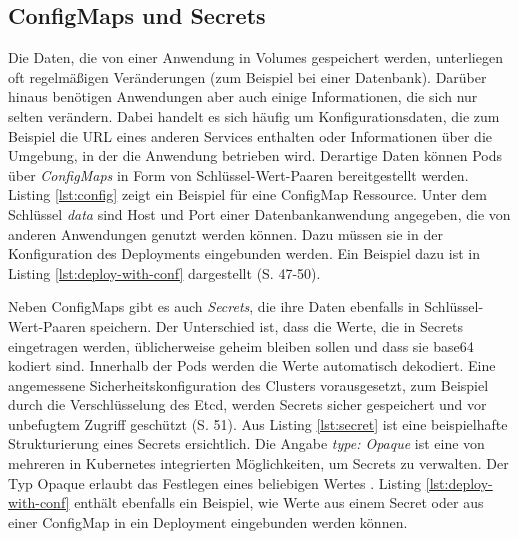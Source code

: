 \documentclass[11pt,a4paper]{article}
\begin{document}
\subsection{ConfigMaps und Secrets}
Die Daten, die von einer Anwendung in Volumes gespeichert werden, unterliegen oft regelmäßigen Veränderungen
(zum Beispiel bei einer Datenbank). Darüber hinaus benötigen Anwendungen aber auch einige Informationen, die sich nur
selten verändern. Dabei handelt es sich häufig um Konfigurationsdaten, die zum Beispiel die URL eines anderen
Services enthalten oder Informationen über die Umgebung, in der die Anwendung betrieben wird.
Derartige Daten können Pods über \emph{ConfigMaps} in Form von Schlüssel-Wert-Paaren bereitgestellt werden.
Listing \ref{lst:config} zeigt ein Beispiel für eine ConfigMap Ressource.
Unter dem Schlüssel \emph{data} sind Host und Port einer Datenbankanwendung angegeben,
die von anderen Anwendungen genutzt werden können. Dazu müssen sie in der Konfiguration des
Deployments eingebunden werden. Ein Beispiel dazu ist in Listing \ref{lst:deploy-with-conf} dargestellt \cite{Schmeling_Dargatz_2022} (S. 47-50).

% 


Neben ConfigMaps gibt es auch \emph{Secrets}, die ihre Daten ebenfalls in Schlüssel-Wert-Paaren speichern.
Der Unterschied ist, dass die Werte, die in Secrets eingetragen werden, üblicherweise geheim bleiben sollen und
dass sie base64 \cite{rfc4648} kodiert sind. Innerhalb der Pods werden die Werte automatisch dekodiert.
Eine angemessene Sicherheitskonfiguration des Clusters vorausgesetzt, zum Beispiel durch die Verschlüsselung des Etcd,
werden Secrets sicher gespeichert und vor unbefugtem Zugriff geschützt \cite{Schmeling_Dargatz_2022} (S. 51).
Aus Listing \ref{lst:secret} ist eine beispielhafte Strukturierung eines Secrets ersichtlich.
Die Angabe \emph{type: Opaque} ist eine von mehreren in Kubernetes integrierten Möglichkeiten,
um Secrets zu verwalten. Der Typ Opaque erlaubt das Festlegen eines beliebigen Wertes \cite{kubernetes.io_secret_types}.
Listing \ref{lst:deploy-with-conf} enthält ebenfalls ein Beispiel, wie Werte aus einem
Secret oder aus einer ConfigMap in ein Deployment eingebunden werden können.
\end{document}
